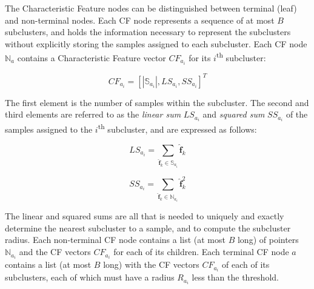 The Characteristic Feature nodes can be distinguished between terminal (leaf) and non-terminal nodes. Each CF node represents a sequence of at most $B$ subclusters, and holds the information necessary to represent the subclusters without explicitly storing the samples assigned to each subcluster. Each CF node $\mathbb{N}_{a}$ contains a Characteristic Feature vector $CF_{a_{i}}$ for its $i$\textsuperscript{th} subcluster:

\begin{equation}
\label{eqn:chap10-birch-cf}
CF_{a_{i}} = \left[|\mathbb{S}_{a_{i}}|, LS_{a_{i}}, SS_{a_{i}}\right]^{T}
\end{equation}

\noindent The first element is the number of samples within the subcluster. The second and third elements are referred to as the \textit{linear sum} $LS_{a_{i}}$ and \textit{squared sum} $SS_{a_{i}}$ of the samples assigned to the $i$\textsuperscript{th} subcluster, and are expressed as follows:

\begin{equation}
\label{eqn:chap10-birch-linear-sum}
LS_{a_{i}} = \displaystyle\sum\limits_{\boldsymbol{\hat{f}}_{k} \in \mathbb{S}_{a_{i}}} \boldsymbol{\hat{f}}_{k}
\end{equation}

\begin{equation}
\label{eqn:chap10-birch-square-sum}
SS_{a_{i}} = \displaystyle\sum\limits_{\boldsymbol{\hat{f}}_{k} \in \mathbb{N}_{a_{i}}} \boldsymbol{\hat{f}}_{k}^{2}
\end{equation}

\noindent The linear and squared sums are all that is needed to uniquely and exactly determine the nearest subcluster to a sample, and to compute the subcluster radius. Each non-terminal CF node contains a list (at most $B$ long) of pointers $\mathbb{N}_{a_{i}}$ and the CF vectors $CF_{a_{i}}$ for each of its children. Each terminal CF node $a$ contains a list (at most $B$ long) with the CF vectors $CF_{a_{i}}$ of each of its subclusters, each of which must have a radius $R_{a_{i}}$ less than the threshold.

